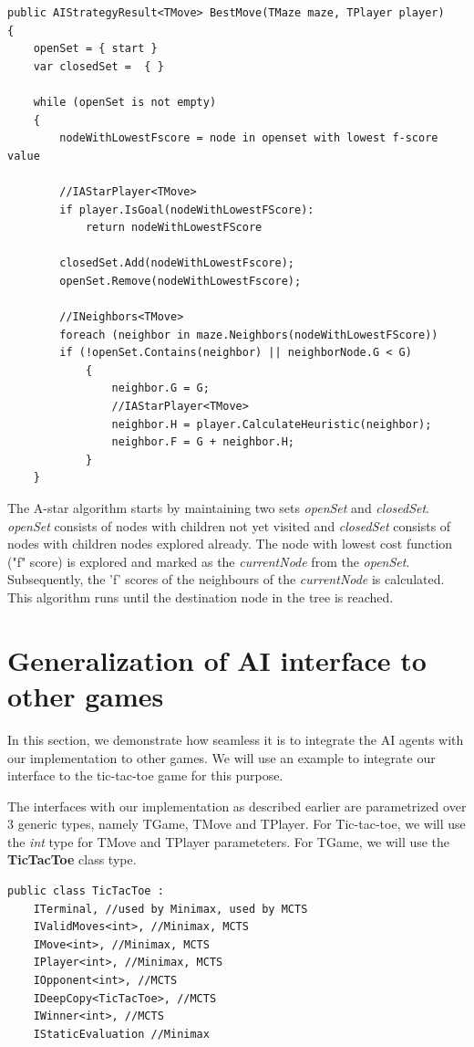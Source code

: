 \begin{lstlisting}
public AIStrategyResult<TMove> BestMove(TMaze maze, TPlayer player)
{
    openSet = { start }
    var closedSet =  { }

    while (openSet is not empty)
    {
        nodeWithLowestFscore = node in openset with lowest f-score value

        //IAStarPlayer<TMove>
        if player.IsGoal(nodeWithLowestFScore):
            return nodeWithLowestFScore

        closedSet.Add(nodeWithLowestFscore);
        openSet.Remove(nodeWithLowestFscore);
        
        //INeighbors<TMove>
        foreach (neighbor in maze.Neighbors(nodeWithLowestFScore))
        if (!openSet.Contains(neighbor) || neighborNode.G < G)
            {
                neighbor.G = G;
                //IAStarPlayer<TMove>
                neighbor.H = player.CalculateHeuristic(neighbor);
                neighbor.F = G + neighbor.H;
            }
    }
\end{lstlisting}

The A-star algorithm starts by maintaining two sets \textit{openSet} and \textit{closedSet}. \textit{openSet} consists of nodes with children not yet visited and \textit{closedSet} consists of nodes with children nodes explored already. The node with lowest cost function ("f" score) is explored and marked as the \textit{currentNode} from the \textit{openSet}. Subsequently, the 'f' scores of the neighbours of the \textit{currentNode} is calculated. This algorithm runs until the destination node in the tree is reached.

\section{Generalization of AI interface to other games}
\label{TicTacToe}

In this section, we demonstrate how seamless it is to integrate the \gls{AI} agents with our implementation to other games. We will use an example to integrate our interface to the tic-tac-toe game for this purpose.

The interfaces with our implementation as described earlier  are parametrized over 3 generic types, namely TGame, TMove and TPlayer. For Tic-tac-toe, we will use the \textit{int} type for TMove and TPlayer parameteters. For TGame, we will use the \textbf{TicTacToe} class type.

\begin{lstlisting}
public class TicTacToe :
    ITerminal, //used by Minimax, used by MCTS
    IValidMoves<int>, //Minimax, MCTS
    IMove<int>, //Minimax, MCTS
    IPlayer<int>, //Minimax, MCTS
    IOpponent<int>, //MCTS
    IDeepCopy<TicTacToe>, //MCTS
    IWinner<int>, //MCTS
    IStaticEvaluation //Minimax
\end{lstlisting}

